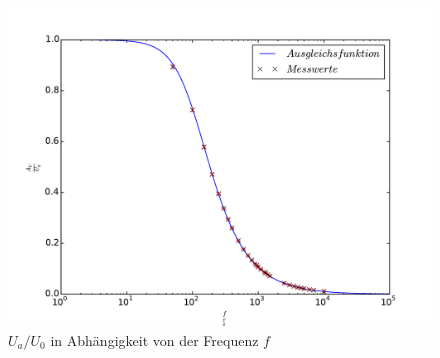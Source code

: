 \begin{figure}[h]
  \centering
  \includegraphics[width=1\textwidth]{b.pdf}
  \caption{$U_a/U_0$ in Abhängigkeit von der Frequenz $f$}
  \label{abb:b}
\end{figure}
